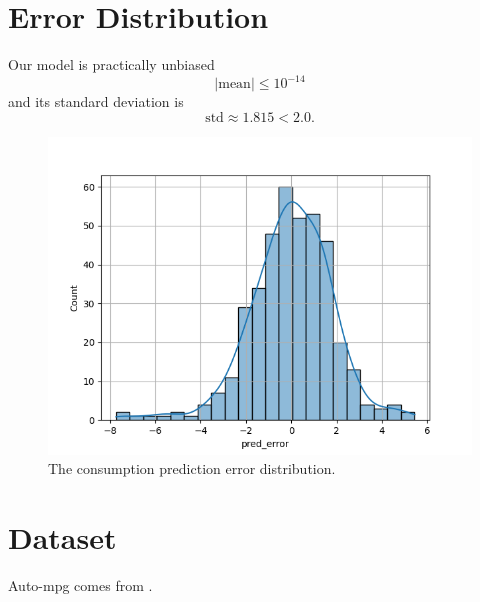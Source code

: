 \documentclass{article}
\begin{document}
\section{Error Distribution}

Our model is practically unbiased 
$$
|\mbox{mean}| \leq 10^{-14}
$$
and its standard deviation is
$$
\mbox{std} \approx 1.815 < 2.0.
$$

\begin{figure}[htbp]
    \centering
    \includegraphics[width=\textwidth]{images/error.png}
    \caption{The consumption prediction error distribution.}
\end{figure}

\section{Dataset}

Auto-mpg comes from \cite{auto_mpg_9}.

\printbibliography
\end{document}
